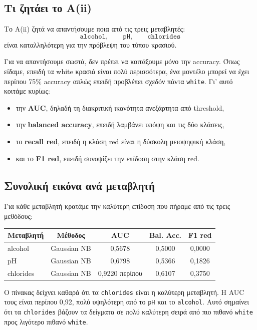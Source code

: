 \documentclass[11pt,a4paper]{article}
\newcommand{\code}[1]{\texttt{#1}}
\begin{document}
\subsection{Τι ζητάει το Α(ii)}

Το Α(ii) ζητά να απαντήσουμε ποια από τις τρεις μεταβλητές:
\[
\code{alcohol}, \qquad \code{pH}, \qquad \code{chlorides}
\]
είναι καταλληλότερη για την πρόβλεψη του τύπου κρασιού.

Για να απαντήσουμε σωστά, δεν πρέπει να κοιτάξουμε μόνο την accuracy. Όπως
είδαμε, επειδή τα white κρασιά είναι πολύ περισσότερα, ένα μοντέλο μπορεί να
έχει περίπου 75\% accuracy απλώς επειδή προβλέπει σχεδόν πάντα \code{white}.
Γι' αυτό κοιτάμε κυρίως:
\begin{itemize}
    \item την \textbf{AUC}, δηλαδή τη διακριτική ικανότητα ανεξάρτητα από
    threshold,
    \item την \textbf{balanced accuracy}, επειδή λαμβάνει υπόψη και τις δύο
    κλάσεις,
    \item το \textbf{recall red}, επειδή η κλάση red είναι η δύσκολη
    μειοψηφική κλάση,
    \item και το \textbf{F1 red}, επειδή συνοψίζει την επίδοση στην κλάση red.
\end{itemize}

\subsection{Συνολική εικόνα ανά μεταβλητή}

Για κάθε μεταβλητή κρατάμε την καλύτερη επίδοση που πήραμε από τις τρεις
μεθόδους:

\begin{center}
{\small
\begin{tabular}{lcccc}
\toprule
Μεταβλητή & Μέθοδος & AUC & Bal. Acc. & F1 red \\
\midrule
alcohol & Gaussian NB & 0,5678 & 0,5000 & 0,0000 \\
pH & Gaussian NB & 0,6798 & 0,5366 & 0,1826 \\
chlorides & Gaussian NB & 0,9220 περίπου & 0,6107 & 0,3750 \\
\bottomrule
\end{tabular}
}
\end{center}

Ο πίνακας δείχνει καθαρά ότι τα \code{chlorides} είναι η καλύτερη μεταβλητή.
Η AUC τους είναι περίπου 0,92, πολύ υψηλότερη από το \code{pH} και το
\code{alcohol}. Αυτό σημαίνει ότι τα \code{chlorides} βάζουν τα δείγματα σε
πολύ καλύτερη σειρά από πιο πιθανό \code{white} προς λιγότερο πιθανό
\code{white}.
\end{document}
